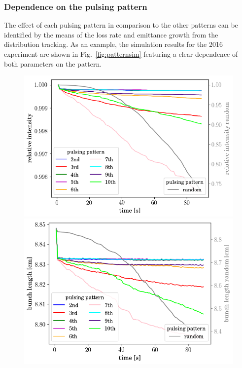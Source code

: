 \documentclass[%
 reprint,
 amsmath,amssymb,
 aps,
prstab,
]{revtex4-1}
\begin{document}
\subsubsection{Dependence on the pulsing pattern\label{sec:pattern}}
The effect of each pulsing pattern in comparison to the other patterns can be identified by the means of the loss rate and emittance growth from the distribution tracking. As an example, the simulation results for the 2016 experiment are shown in Fig.~\ref{fig:patternsim} featuring a clear dependence of both parameters on the pattern.
\begin{figure}[h]
	\begin{minipage}[t]{0.49\linewidth}
		\centering
		\includegraphics[width=1.0\linewidth]{2016injerra2b2u_pattern_3_5um_intensity.png}
	\end{minipage}
	\begin{minipage}[t]{0.49\linewidth}
		\centering
		\includegraphics[width=1.0\linewidth]{2016injerra2b2u_pattern_3_5um_sigm.png}

\end{minipage}
\end{figure}
\end{document}
